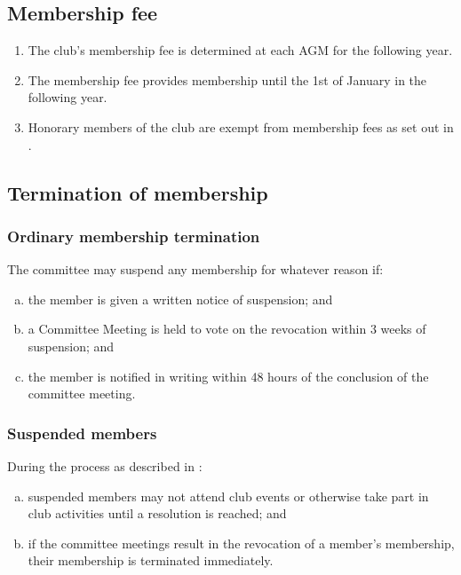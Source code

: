 \documentclass{constitution}
\begin{document}
\subsection{Membership fee}\label{membershipFee}
\begin{enumerate}[(1)]
    \item The club's membership fee is determined at each AGM for the following year.
    \item The membership fee provides membership until the 1st of January in the following year.
    \item Honorary members of the club are exempt from membership fees as set out in .
\end{enumerate}

\subsection{Termination of membership}\label{terminationMembership}
\subsubsection{Ordinary membership termination}\label{ordinaryMembershipTerimnation}
The committee may suspend any membership for whatever reason if:
\begin{enumerate}[(a)]
    \item the member is given a written notice of suspension; and
    \item a Committee Meeting is held to vote on the revocation within 3 weeks of suspension; and
    \item the member is notified in writing within 48 hours of the conclusion of the committee meeting.
\end{enumerate}

\subsubsection{Suspended members}\label{suspendedMembers}
During the process as described in :
\begin{enumerate}[(a)]
    \item suspended members may not attend club events or otherwise take part in club activities until a resolution is reached; and
    \item if the committee meetings result in the revocation of a member's membership, their membership is terminated immediately.
\end{enumerate}
\end{document}
